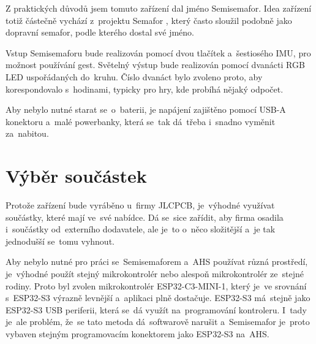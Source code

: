 


Z praktických důvodů jsem tomuto zařízení dal jméno Semisemafor.
Idea zařízení totiž částečně vychází z~projektu Semafor \cite{StarySemafor}, který často sloužil podobně jako dopravní semafor, podle kterého dostal své jméno.

Vstup Semisemaforu bude realizován pomocí dvou tlačítek a~šestiosého IMU, pro možnost používání gest.
Světelný výstup bude realizován pomocí dvanácti RGB LED uspořádaných do~kruhu.
Číslo dvanáct bylo zvoleno proto, aby korespondovalo s~hodinami, typicky pro hry, kde probíhá nějaký odpočet.

Aby nebylo nutné starat se~o~baterii, je napájení zajištěno pomocí USB-A konektoru a~malé powerbanky, která se~tak dá~třeba i~snadno vyměnit za~nabitou.

\section{Výběr součástek}
Protože zařízení bude vyráběno u~firmy JLCPCB, je~výhodné využívat součástky, které mají ve~své nabídce.
Dá se~sice zařídit, aby firma osadila i~součástky od~externího dodavatele, ale je~to o~něco složitější a~je tak jednodušší se~tomu vyhnout.

Aby nebylo nutné pro práci se~Semisemaforem a~AHS používat různá prostředí, je~výhodné použít stejný mikrokontrolér nebo alespoň mikrokontrolér ze~stejné rodiny.
Proto byl zvolen mikrokontrolér ESP32-C3-MINI-1, který je~ve srovnání s~ESP32-S3 výrazně levnější a~aplikaci plně dostačuje. 
ESP32-S3 má~stejně jako ESP32-S3 USB periferii, která se~dá využít na~programování kontroleru.
I~tady je~ale problém, že~se tato metoda dá~softwarově narušit a~Semisemafor je~proto vybaven stejným programovacím konektorem jako ESP32-S3 na~AHS.


